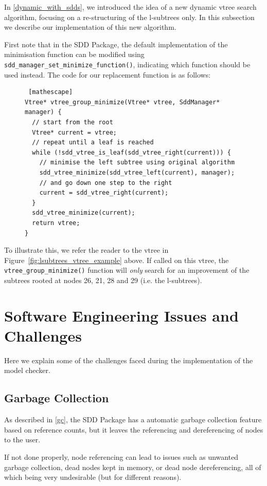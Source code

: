 \documentclass[11pt]{report}
\begin{document}
In \ref{dynamic_with_sdds}, we introduced the idea of a new dynamic vtree search algorithm, focusing on a re-structuring of the l-subtrees only. In this subsection we describe our implementation of this new algorithm.


First note that in the SDD Package, the default implementation of the minimisation function can be modified using \texttt{sdd\_manager\_set\_minimize\_function()},  indicating which function should be used instead.
The code for our replacement function is as follows: 
\begin{figure}

\begin{lstlisting} [mathescape]
Vtree* vtree_group_minimize(Vtree* vtree, SddManager* manager) {
  // start from the root   
  Vtree* current = vtree; 
  // repeat until a leaf is reached
  while (!sdd_vtree_is_leaf(sdd_vtree_right(current))) {
    // minimise the left subtree using original algorithm
    sdd_vtree_minimize(sdd_vtree_left(current), manager);
    // and go down one step to the right
    current = sdd_vtree_right(current);	
  }
  sdd_vtree_minimize(current);
  return vtree;
} 
\end{lstlisting}

\end{figure}

To illustrate this, we refer the reader to the vtree in Figure~\ref{fig:lsubtrees_vtree_example} above. If called on this vtree, the \texttt{vtree\_group\_minimize()} function will \textit{only }search for an improvement of the subtrees rooted at nodes 26, 21, 28 and 29 (i.e. the l-subtrees). 

\section{Software Engineering Issues and Challenges}

Here we explain some of the challenges faced during the implementation of the model checker. 

\subsection{Garbage Collection}

As described in \ref{gc}, the SDD Package has a automatic garbage collection feature based on reference counts, but it leaves the referencing and dereferencing of nodes to the user. 

If not done properly, node referencing can lead to issues such as unwanted garbage collection, dead nodes kept in memory, or dead node dereferencing, all of which being very undesirable (but for different reasons).
\end{document}
